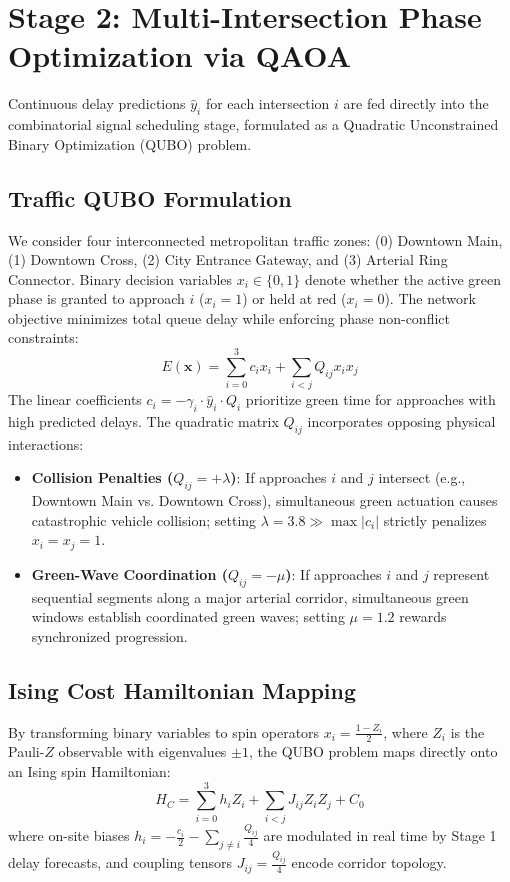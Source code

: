 \documentclass{llncs}
\begin{document}
\section{Stage 2: Multi-Intersection Phase Optimization via QAOA}

Continuous delay predictions $\hat{y}_i$ for each intersection $i$ are fed directly into the combinatorial signal scheduling stage, formulated as a Quadratic Unconstrained Binary Optimization (QUBO) problem.

\subsection{Traffic QUBO Formulation}
We consider four interconnected metropolitan traffic zones: (0) Downtown Main, (1) Downtown Cross, (2) City Entrance Gateway, and (3) Arterial Ring Connector. Binary decision variables $x_i \in \{0, 1\}$ denote whether the active green phase is granted to approach $i$ ($x_i = 1$) or held at red ($x_i = 0$). The network objective minimizes total queue delay while enforcing phase non-conflict constraints:
\begin{equation}
E(\mathbf{x}) = \sum_{i=0}^{3} c_i x_i + \sum_{i < j} Q_{ij} x_i x_j
\end{equation}
The linear coefficients $c_i = -\gamma_i \cdot \hat{y}_i \cdot Q_i$ prioritize green time for approaches with high predicted delays. The quadratic matrix $Q_{ij}$ incorporates opposing physical interactions:
\begin{itemize}
    \item \textbf{Collision Penalties ($Q_{ij} = +\lambda$)}: If approaches $i$ and $j$ intersect (e.g., Downtown Main vs. Downtown Cross), simultaneous green actuation causes catastrophic vehicle collision; setting $\lambda = 3.8 \gg \max |c_i|$ strictly penalizes $x_i = x_j = 1$.
    \item \textbf{Green-Wave Coordination ($Q_{ij} = -\mu$)}: If approaches $i$ and $j$ represent sequential segments along a major arterial corridor, simultaneous green windows establish coordinated green waves; setting $\mu = 1.2$ rewards synchronized progression.
\end{itemize}

\subsection{Ising Cost Hamiltonian Mapping}
By transforming binary variables to spin operators $x_i = \frac{1 - Z_i}{2}$, where $Z_i$ is the Pauli-$Z$ observable with eigenvalues $\pm 1$, the QUBO problem maps directly onto an Ising spin Hamiltonian:
\begin{equation}
H_C = \sum_{i=0}^{3} h_i Z_i + \sum_{i < j} J_{ij} Z_i Z_j + C_0
\end{equation}
where on-site biases $h_i = -\frac{c_i}{2} - \sum_{j \neq i} \frac{Q_{ij}}{4}$ are modulated in real time by Stage 1 delay forecasts, and coupling tensors $J_{ij} = \frac{Q_{ij}}{4}$ encode corridor topology.
\end{document}
